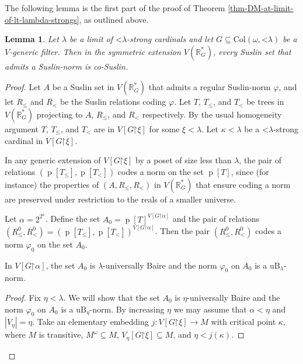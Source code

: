 \documentclass[fleqn, 11pt]{amsart}
\theoremstyle{plain}
\newtheorem{lem}[thm]{Lemma} \newtheorem*{lem*}{Lemma}
\theoremstyle{definition}
\theoremstyle{remark}
\newcommand{\uB}{\mathrm{uB}}
\newcommand{\bbR}{\mathbb{R}}
\newcommand{\Col}{\mathrm{Col}}
\newcommand{\restrict}{\mathord{\restriction}}
\newcommand{\less}{\mathord{<}}
\DeclareMathOperator{\p}{p}
\begin{document}
The following lemma is the first part of the proof of Theorem \ref{thm-DM-at-limit-of-lt-lambda-strongs}, as outlined above. 


\begin{lem}\label{lem-suslin-norm-co-suslin}
 Let $\lambda$ be a limit of $\mathord{<}\lambda$-strong cardinals and let $G \subseteq \Col(\omega,\mathord{<}\lambda)$ be a $V$-generic filter.  Then in the symmetric extension $V(\mathbb{R}^*_G)$, every Suslin set that admits a Suslin-norm is co-Suslin.
 \end{lem}
 
\begin{proof}
 Let $A$ be a Suslin set in $V(\mathbb{R}^*_G)$ that admits a regular Suslin-norm $\varphi$, and let $R_\le$ and $R_<$ be the Suslin relations coding $\varphi$. Let $T$, $T_\le$, and $T_<$ be trees in $V(\bbR^{*}_{G})$ projecting to $A$, $R_\le$, and $R_<$ respectively.  By the usual homogeneity argument $T$, $T_\le$, and $T_<$ are in $V[G \restrict \xi]$ for some $\xi < \lambda$. Let $\kappa < \lambda$ be a $\less\lambda$-strong cardinal in $V[G \restrict \xi]$. 
 
 In any generic extension of $V[G \restrict \xi]$ by a poset of size less than $\lambda$, the pair of relations $(\p[T_\le], \p[T_<])$ codes a norm on the set $\p[T]$, since (for instance) the properties of $(A, R_\le, R_<)$ in $V(\mathbb{R}^*_G)$ that ensure coding a norm are preserved under restriction to the reals of a smaller universe.
 
  Let $\alpha = 2^{2^\kappa}$. Define the set $A_0 = \p[T]^{V[G \restrict \alpha]}$ and the pair of relations $(R^{0}_{\le}, R^{0}_{<}) = (\p[T_\le], \p[T_<])^{V[G \restrict \alpha]}$. Then the pair $(R^{0}_{\le}, R^{0}_{<})$ codes a norm $\varphi_0$ on the set $A_0$.
 
 
 \begin{claim*}
  In $V[G \restrict \alpha]$,
  the set $A_0$ is $\lambda$-universally Baire and the norm $\varphi_0$ on $A_0$ is a $\uB_{\lambda}$-norm.
 \end{claim*}
 
 \begin{proof}%
  Fix $\eta < \lambda$. We will show that the set $A_0$ is $\eta$-universally Baire and the norm $\varphi_0$ on $A_0$ is a $\uB_{\eta}$-norm.
  By increasing $\eta$ we may assume that $\alpha < \eta$ and $\left|V_\eta\right| = \eta$.
  Take an elementary embedding $j \colon V[G \restrict \xi] \to M$ with critical point $\kappa$, where $M$ is transitive, $M^\omega \subseteq M$, $V_\eta[G \restrict \xi] \subseteq M$, and $\eta < j(\kappa)$. 
   

\end{proof}
\end{proof}
\end{document}
